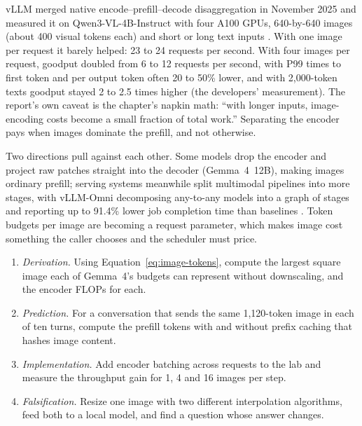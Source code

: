 


vLLM merged native encode--prefill--decode disaggregation in November 2025
and measured it on Qwen3-VL-4B-Instruct with four A100 GPUs, 640-by-640 images
(about 400 visual tokens each) and short or long text inputs
\cite{vllm2025epd}. With one image per request it barely helped: 23 to 24
requests per second. With four images per request, goodput doubled from 6 to
12 requests per second, with P99 times to first token and per output token often
20 to 50\% lower, and with 2,000-token texts goodput stayed 2 to 2.5 times
higher (the developers' measurement). The report's own caveat is the chapter's
napkin math: ``with longer inputs, image-encoding costs become a small
fraction of total work.'' Separating the encoder pays when images dominate the
prefill, and not otherwise.


Two directions pull against each other. Some models drop the encoder and
project raw patches straight into the decoder (Gemma~4~12B), making images
ordinary prefill; serving systems meanwhile split multimodal pipelines into
more stages, with vLLM-Omni decomposing any-to-any models into a graph of
stages and reporting up to 91.4\% lower job completion time than baselines
\cite{yin2026vllmomni}. Token budgets per image are becoming a request
parameter, which makes image cost something the caller chooses and the
scheduler must price.

\ExercisesSection

\begin{enumerate}
\item \emph{Derivation.} Using Equation~\ref{eq:image-tokens}, compute the
  largest square image each of Gemma~4's budgets can represent without
  downscaling, and the encoder FLOPs for each.
\item \emph{Prediction.} For a conversation that sends the same 1,120-token
  image in each of ten turns, compute the prefill tokens with and without
  prefix caching that hashes image content.
\item \emph{Implementation.} Add encoder batching across requests to the lab
  and measure the throughput gain for 1, 4 and 16 images per step.
\item \emph{Falsification.} Resize one image with two different
  interpolation algorithms, feed both to a local model, and find a question
  whose answer changes.
\end{enumerate}
